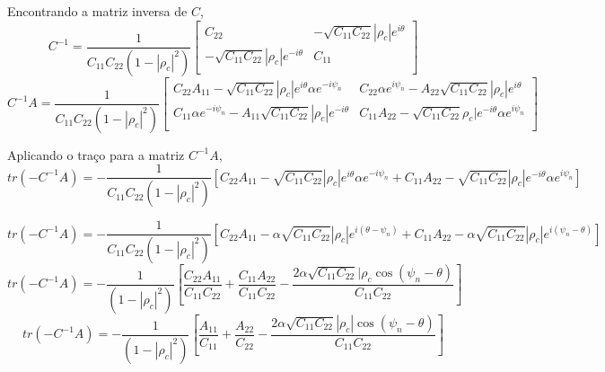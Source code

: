 \documentclass[12pt,a4paper]{article}
\begin{document}
Encontrando a matriz inversa de $C$,
\begin{equation}\label{eqn44}
	C^{-1}=\frac{1}{C_{11}C_{22}(1-|\rho_c|^2)}\left[
\begin{array}{cc}
	C_{22}              & -\sqrt{C_{11}C_{22}}|\rho_c |e^{i\theta} \\
 -\sqrt{C_{11}C_{22}}|\rho_c|e^{-i\theta} & C_{11}\\
\end{array}\right]
\end{equation}
\begin{equation}\label{eqn45}
	C^{-1}A=\frac{1}{C_{11}C_{22}(1-|\rho_c|^2)}\left[
\begin{array}{cc}
	C_{22}A_{11}-\sqrt{C_{11}C_{22}}|\rho_c|e^{i\theta}\alpha e^{-i\psi_n} & C_{22} \alpha e^{i\psi_n}-A_{22}\sqrt{C_{11}C_{22}}|\rho_c|e^{i\theta} \\
	C_{11}\alpha e^{-i\psi_n}-A_{11}\sqrt{C_{11}C_{22}}|\rho_c|e^{-i\theta} & C_{11}A_{22}-\sqrt{C_{11}C_{22}}\rho_c|e^{-i\theta}\alpha e^{i\psi_n} \\
\end{array}\right]
\end{equation}

Aplicando o traço para a matriz $C^{-1}A$,
{\footnotesize
\begin{equation}\label{eqn46}
	tr(-C^{-1}A)=-\frac{1}{C_{11}C_{22}(1-|\rho_c|^2)}\left[
	C_{22}A_{11}-\sqrt{C_{11}C_{22}}|\rho_c |e^{i\theta}\alpha e^{-i\psi_n} + C_{11}A_{22}-\sqrt{C_{11}C_{22}}|\rho_c|e^{-i\theta}\alpha e^{i\psi_n} \right]
\end{equation}}

{\footnotesize
\begin{equation}\label{eqn47}
	tr(-C^{-1}A)=-\frac{1}{C_{11}C_{22}(1-|\rho_c|^2)}\left[
		C_{22}A_{11}-\alpha \sqrt{C_{11}C_{22}}|\rho_c|e^{i(\theta-\psi_n)} + C_{11}A_{22}-\alpha \sqrt{C_{11}C_{22}}|\rho_c|e^{i(\psi_n-\theta)}\right]
\end{equation}}
{\footnotesize
\begin{equation}\label{eqn48}
	tr(-C^{-1}A)=-\frac{1}{(1-|\rho_c|^2)}\left[
	\frac{C_{22}A_{11}}{C_{11}C_{22}}+\frac{C_{11}A_{22}}{C_{11}C_{22}}-\frac{2\alpha \sqrt{C_{11}C_{22}}|\rho_c \cos(\psi_n-\theta)}{C_{11}C_{22}}\right]
\end{equation}}
{\footnotesize
\begin{equation}\label{eqn49}
	tr(-C^{-1}A)=-\frac{1}{(1-|\rho_c|^2)}\left[
	\frac{A_{11}}{C_{11}}+\frac{A_{22}}{C_{22}}-\frac{2\alpha \sqrt{C_{11}C_{22}}|\rho_c |\cos(\psi_n-\theta)}{C_{11}C_{22}}\right]
\end{equation}}
\end{document}
